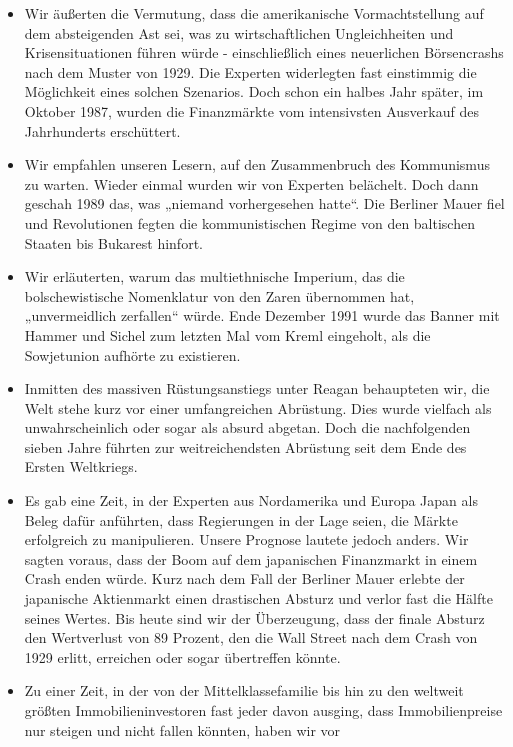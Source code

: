 \documentclass[
  a5paper,
  smalldemyvopaper,10pt,twoside,onecolumn,openright,extrafontsizes,hidelinks]{memoir}
\begin{document}
\begin{itemize}
\item
  Wir äußerten die Vermutung, dass die amerikanische Vormachtstellung
  auf dem absteigenden Ast sei, was zu wirtschaftlichen Ungleichheiten
  und Krisensituationen führen würde - einschließlich eines neuerlichen
  Börsencrashs nach dem Muster von 1929. Die Experten widerlegten fast
  einstimmig die Möglichkeit eines solchen Szenarios. Doch schon ein
  halbes Jahr später, im Oktober 1987, wurden die Finanzmärkte vom
  intensivsten Ausverkauf des Jahrhunderts erschüttert.
\item
  Wir empfahlen unseren Lesern, auf den Zusammenbruch des Kommunismus zu
  warten. Wieder einmal wurden wir von Experten belächelt. Doch dann
  geschah 1989 das, was „niemand vorhergesehen hatte``. Die Berliner
  Mauer fiel und Revolutionen fegten die kommunistischen Regime von den
  baltischen Staaten bis Bukarest hinfort.
\item
  Wir erläuterten, warum das multiethnische Imperium, das die
  bolschewistische Nomenklatur von den Zaren übernommen hat,
  „unvermeidlich zerfallen`` würde. Ende Dezember 1991 wurde das Banner
  mit Hammer und Sichel zum letzten Mal vom Kreml eingeholt, als die
  Sowjetunion aufhörte zu existieren.
\item
  Inmitten des massiven Rüstungsanstiegs unter Reagan behaupteten wir,
  die Welt stehe kurz vor einer umfangreichen Abrüstung. Dies wurde
  vielfach als unwahrscheinlich oder sogar als absurd abgetan. Doch die
  nachfolgenden sieben Jahre führten zur weitreichendsten Abrüstung seit
  dem Ende des Ersten Weltkriegs.
\item
  Es gab eine Zeit, in der Experten aus Nordamerika und Europa Japan als
  Beleg dafür anführten, dass Regierungen in der Lage seien, die Märkte
  erfolgreich zu manipulieren. Unsere Prognose lautete jedoch anders.
  Wir sagten voraus, dass der Boom auf dem japanischen Finanzmarkt in
  einem Crash enden würde. Kurz nach dem Fall der Berliner Mauer erlebte
  der japanische Aktienmarkt einen drastischen Absturz und verlor fast
  die Hälfte seines Wertes. Bis heute sind wir der Überzeugung, dass der
  finale Absturz den Wertverlust von 89 Prozent, den die Wall Street
  nach dem Crash von 1929 erlitt, erreichen oder sogar übertreffen
  könnte.
\item
  Zu einer Zeit, in der von der Mittelklassefamilie bis hin zu den
  weltweit größten Immobilieninvestoren fast jeder davon ausging, dass
  Immobilienpreise nur steigen und nicht fallen könnten, haben wir vor

\end{itemize}
\end{document}
